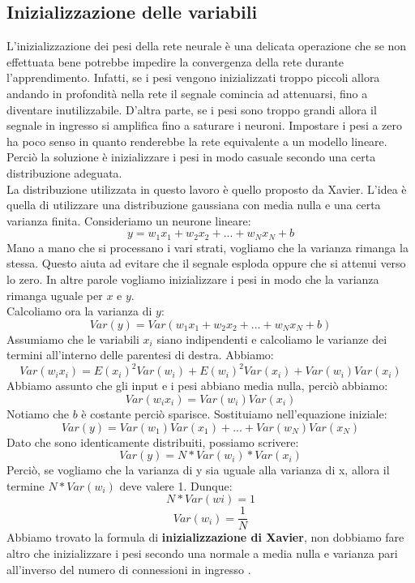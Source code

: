 \subsection{Inizializzazione delle variabili}
L'inizializzazione dei pesi della rete neurale è una delicata operazione che se non effettuata bene potrebbe impedire la convergenza della rete durante l'apprendimento. Infatti, se i pesi vengono inizializzati troppo piccoli allora andando in profondità nella rete il segnale comincia ad attenuarsi, fino a diventare inutilizzabile. D'altra parte, se i pesi sono troppo grandi allora il segnale in ingresso si amplifica fino a saturare i neuroni. Impostare i pesi a zero ha poco senso in quanto renderebbe la rete equivalente a un modello lineare. Perciò la soluzione è inizializzare i pesi in modo casuale secondo una certa distribuzione adeguata.\\
La distribuzione utilizzata in questo lavoro è quello proposto da Xavier. L'idea è quella di utilizzare una distribuzione gaussiana con media nulla e una certa varianza finita. Consideriamo un neurone lineare:
$$y = w_1 x_1 + w_2 x_2 + ... + w_N x_N + b$$
Mano a mano che si processano i vari strati, vogliamo che la varianza rimanga la stessa. Questo aiuta ad evitare che il segnale esploda oppure che si attenui verso lo zero. In altre parole vogliamo inizializzare i pesi in modo che la varianza rimanga uguale per $x$ e $y$.\\
Calcoliamo ora la varianza di $y$:
$$Var(y) = Var(w_1x_1 + w_2x_2 + ... + w_Nx_N + b)$$
Assumiamo che le variabili $x_i$ siano indipendenti e calcoliamo le varianze dei termini all'interno delle parentesi di destra. Abbiamo:
$$Var(w_ix_i) = E(x_i)^2Var(w_i) + E(w_i)^2Var(x_i) + Var(w_i)Var(x_i)$$
Abbiamo assunto che gli input e i pesi abbiano media nulla, perciò abbiamo:
$$Var(w_ix_i) = Var(w_i)Var(x_i)$$
Notiamo che $b$ è costante perciò sparisce. Sostituiamo nell'equazione iniziale:
$$Var(y) = Var(w_1)Var(x_1) + ... + Var(w_N)Var(x_N)$$
Dato che sono identicamente distribuiti, possiamo scrivere:
$$Var(y) = N * Var(w_i) * Var(x_i)$$
Perciò, se vogliamo che la varianza di y sia uguale alla varianza di x, allora il termine $N*Var(w_i)$ deve valere 1. Dunque:
$$N * Var(wi) = 1$$
$$Var(w_i) = \frac{1}{N}$$
Abbiamo trovato la formula di \textbf{inizializzazione di Xavier}, non dobbiamo fare altro che inizializzare i pesi secondo una normale a media nulla e varianza pari all'inverso del numero di connessioni in ingresso \cite{xavier}.
